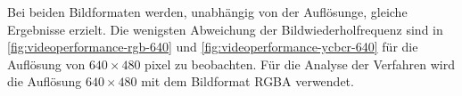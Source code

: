 Bei beiden Bildformaten werden, unabhängig von der Auflösunge, gleiche Ergebnisse erzielt. Die wenigsten Abweichung der
 Bildwiederholfrequenz sind in \autoref{fig:videoperformance-rgb-640} und \autoref{fig:videoperformance-ycbcr-640} für die
 Auflösung von $640 \times 480$ \gls{pixel} zu beobachten. Für die Analyse der Verfahren wird die Auflösung
 $640 \times 480$ mit dem Bildformat RGBA verwendet.

